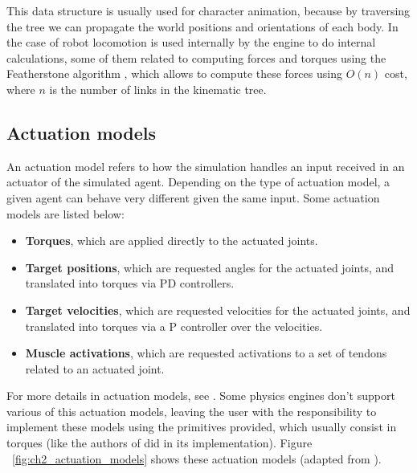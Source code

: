 This data structure is usually used for character animation, because by traversing 
the tree we can propagate the world positions and orientations of each body. In the
case of robot locomotion is used internally by the engine to do internal calculations,
some of them related to computing forces and torques using the Featherstone algorithm \citep{Featherstone},
which allows to compute these forces using $O(n)$ cost, where $n$ is the number of
links in the kinematic tree.

\figKinTreeRepresentation

\subsection{Actuation models}

An actuation model refers to how the simulation handles an input received in an actuator
of the simulated agent. Depending on the type of actuation model, a given agent
can behave very different given the same input. Some actuation models are listed below:

\begin{itemize}
    \item \textbf{Torques}, which are applied directly to the actuated joints.
    \item \textbf{Target positions}, which are requested angles for the actuated joints,
          and translated into torques via PD controllers.
    \item \textbf{Target velocities}, which are requested velocities for the actuated joints,
          and translated into torques via a P controller over the velocities.
    \item \textbf{Muscle activations}, which are requested activations to a set of tendons
          related to an actuated joint.
\end{itemize}

For more details in actuation models, see \cite{ActuationChoice}. Some physics engines don't support 
various of this actuation models, leaving the user with the responsibility to implement
these models using the primitives provided, which usually consist in torques (like the authors
of \citep{DeepmindEmergenceLocomotion} did in its implementation). Figure ~\ref{fig:ch2_actuation_models} 
shows these actuation models (adapted from \cite{ActuationChoice}).

\figActuationModels

